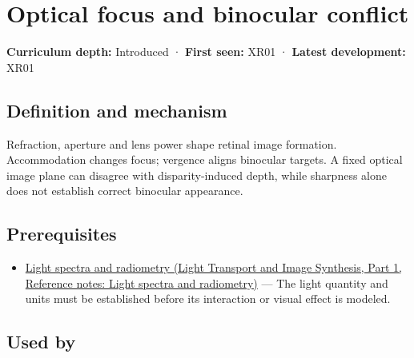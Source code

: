\hypertarget{appendix-f90cee1be7a4}{}\label{referencestart:appendix-f90cee1be7a4}
\section{Optical focus and binocular conflict}\label{appendix-f90cee1be7a4-optical-focus-and-binocular-conflict}

\hypertarget{appendix-f90cee1be7a4-optical-focus-and-binocular-conflict}{}

\textbf{Curriculum depth:} Introduced · \textbf{First seen:} XR01 · \textbf{Latest development:} XR01

\begin{allmightroledefinition}

\subsection{Definition and mechanism}\label{appendix-f90cee1be7a4-definition-and-mechanism}

\hypertarget{appendix-f90cee1be7a4-definition-and-mechanism}{}

Refraction, aperture and lens power shape retinal image formation. Accommodation changes focus; vergence aligns binocular targets. A fixed optical image plane can disagree with disparity-induced depth, while sharpness alone does not establish correct binocular appearance.

\end{allmightroledefinition}

\subsection{Prerequisites}\label{appendix-f90cee1be7a4-prerequisites}

\hypertarget{appendix-f90cee1be7a4-prerequisites}{}

\begin{itemize}
\tightlist
\item
  \href{../04-Light-Transport-and-Image-Synthesis-P01/main.pdf\#nameddest=appendix-215c2570199b}{Light spectra and radiometry (Light Transport and Image Synthesis, Part 1, Reference notes: Light spectra and radiometry)} --- The light quantity and units must be established before its interaction or visual effect is modeled.
\end{itemize}

\subsection{Used by}\label{appendix-f90cee1be7a4-used-by}

